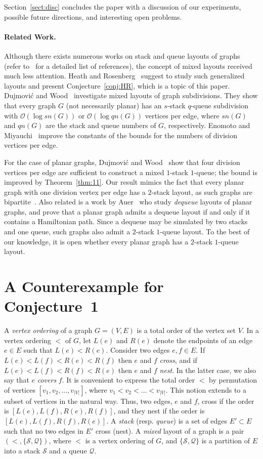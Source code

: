 \documentclass[orivec]{llncs}
\newcommand{\df}[1]{{\it #1}}
\newcommand{\Oh}{{\ensuremath{\mathcal{O}}}}
\newcommand{\Sh}{{\ensuremath{\mathcal{S}}}}
\newcommand{\Qh}{{\ensuremath{\mathcal{Q}}}}
\begin{document}
Section~\ref{sect:disc} concludes the paper with a discussion of our experiments, possible future directions, and
interesting open problems.


\paragraph{Related Work.}

Although there exists numerous works on stack and queue layouts of graphs (refer to~\cite{DW04} for a detailed list of references), 
the concept of mixed layouts received much less attention. Heath and Rosenberg~\cite{HR92} suggest to study such generalized
layouts and present Conjecture~\ref{conj:HR}, which is a topic of this paper.
Dujmovi{\'c} and Wood~\cite{DW05} investigate mixed layouts of graph subdivisions. They show that
every graph $G$ (not necessarily planar) has an $s$-stack $q$-queue subdivision with
$\Oh(\log sn(G))$ or $\Oh(\log qn(G))$ vertices per edge, where $sn(G)$ and $qn(G)$ are
the stack and queue numbers of $G$, respectively. Enomoto and Miyauchi~\cite{EM14} improve
the constants of the bounds for the numbers of division vertices per edge.

For the case of planar graphs, Dujmovi{\'c} and Wood~\cite{DW05} show that four division vertices per edge
are sufficient to construct a mixed $1$-stack $1$-queue; the bound is improved by Theorem~\ref{thm:11}.
Our result mimics the fact that every planar graph with one division vertex per edge
has a $2$-stack layout, as such graphs are bipartite~\cite{Over98}.
Also related is a work by Auer~\cite{Auer14} who study \df{dequeue} layouts of planar graphs, and
prove that a planar graph admits a dequeue layout if and only if it contains a Hamiltonian path.
Since a dequeue may be simulated by two stacks and one queue, such graphs also admit a $2$-stack $1$-queue
layout. To the best of our knowledge, it is open whether every planar graph has a $2$-stack $1$-queue layout.

\section{A Counterexample for Conjecture~1}
\label{sect:ce}

A \df{vertex ordering} of a graph $G=(V,E)$ is a total order of the vertex set $V$. In a vertex ordering
$<$ of $G$, let $L(e)$ and $R(e)$ denote the endpoints of an edge $e \in E$ such that $L(e) < R(e)$.
Consider two edges $e, f \in E$. If $L(e) < L(f) < R(e) < R(f)$ then $e$ and $f$ \df{cross}, 
and if $L(e) < L(f) < R(f) < R(e)$ then $e$ and $f$ \df{nest}. In the latter case, we also say that $e$ \df{covers} $f$.
It is convenient to express the total order $<$
by permutation of vertices $[v_1, v_2, \dots, v_{|V|}]$, where $v_1 < v_2 < \dots < v_{|V|}$.
This notion extends to a subset of vertices in
the natural way. Thus, two edges, $e$ and $f$, cross if the order is $[L(e), L(f), R(e), R(f)]$, and
they nest if the order is $[L(e), L(f), R(f), R(e)]$.
A \df{stack} (resp. \df{queue}) is a set of edges $E' \subset E$ such that no two edges in $E'$ cross (nest).
A \df{mixed} layout of a graph is a pair $(<, \{\Sh, \Qh\})$, where $<$ is a vertex ordering of $G$, 
and $\{\Sh, \Qh\}$ is a partition of $E$ into a stack $\Sh$ and a queue $\Qh$. 
\end{document}
